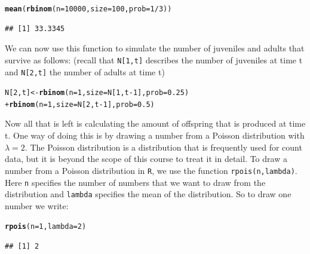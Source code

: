 \documentclass{article}\usepackage[]{graphicx}\usepackage[]{color}
\makeatletter
\newcommand{\hlnum}[1]{\textcolor[rgb]{0.686,0.059,0.569}{#1}}%
\newcommand{\hlopt}[1]{\textcolor[rgb]{0,0,0}{#1}}%
\newcommand{\hlstd}[1]{\textcolor[rgb]{0.345,0.345,0.345}{#1}}%
\newcommand{\hlkwb}[1]{\textcolor[rgb]{0.69,0.353,0.396}{#1}}%
\newcommand{\hlkwc}[1]{\textcolor[rgb]{0.333,0.667,0.333}{#1}}%
\newcommand{\hlkwd}[1]{\textcolor[rgb]{0.737,0.353,0.396}{\textbf{#1}}}%
\newenvironment{kframe}{%
 \def\at@end@of@kframe{}%
 \ifinner\ifhmode%
  \def\at@end@of@kframe{\end{minipage}}%
  \begin{minipage}{\columnwidth}%
 \fi\fi%
 \def\FrameCommand##1{\hskip\@totalleftmargin \hskip-\fboxsep
 \colorbox{shadecolor}{##1}\hskip-\fboxsep
     \hskip-\linewidth \hskip-\@totalleftmargin \hskip\columnwidth}%
 \MakeFramed {\advance\hsize-\width
   \@totalleftmargin\z@ \linewidth\hsize
   \@setminipage}}%
 {\par\unskip\endMakeFramed%
 \at@end@of@kframe}
\newenvironment{knitrout}{}{} %
\makeatother
\begin{document}
\begin{knitrout}
\color{fgcolor}\begin{kframe}
\begin{alltt}
\hlkwd{mean}\hlstd{(}\hlkwd{rbinom}\hlstd{(}\hlkwc{n}\hlstd{=}\hlnum{10000}\hlstd{,}\hlkwc{size}\hlstd{=}\hlnum{100}\hlstd{,}\hlkwc{prob}\hlstd{=}\hlnum{1}\hlopt{/}\hlnum{3}\hlstd{))}
\end{alltt}
\begin{verbatim}
## [1] 33.3345
\end{verbatim}
\end{kframe}
\end{knitrout}
We can now use this function to simulate the number of juveniles and adults that survive as follows:
(recall that \texttt{N[1,t]} describes the number of juveniles at time t and \texttt{N[2,t]} the number of adults at time t)
\begin{knitrout}
\color{fgcolor}\begin{kframe}
\begin{alltt}
\hlstd{N[}\hlnum{2}\hlstd{,t]}\hlkwb{<-}\hlkwd{rbinom}\hlstd{(}\hlkwc{n}\hlstd{=}\hlnum{1}\hlstd{,}\hlkwc{size}\hlstd{=N[}\hlnum{1}\hlstd{,t}\hlopt{-}\hlnum{1}\hlstd{],}\hlkwc{prob}\hlstd{=}\hlnum{0.25}\hlstd{)}
        \hlopt{+} \hlkwd{rbinom}\hlstd{(}\hlkwc{n}\hlstd{=}\hlnum{1}\hlstd{,}\hlkwc{size}\hlstd{=N[}\hlnum{2}\hlstd{,t}\hlopt{-}\hlnum{1}\hlstd{],}\hlkwc{prob}\hlstd{=}\hlnum{0.5}\hlstd{)}
\end{alltt}
\end{kframe}
\end{knitrout}
Now all that is left is calculating the amount of offspring that is produced at time t. One way of doing this is by drawing a number from a Poisson distribution with $\lambda=2$. The Poisson distribution is a distribution that is frequently used for count data, but it is beyond the scope of this course to treat it in detail. To draw a number from a Poisson distribution in \texttt{R}, we use the function \texttt{rpois(n,lambda)}. Here \texttt{n} specifies the number of numbers that we want to draw from the distribution and \texttt{lambda} specifies the mean of the distribution. So to draw one number we write:
\begin{knitrout}
\color{fgcolor}\begin{kframe}
\begin{alltt}
\hlkwd{rpois}\hlstd{(}\hlkwc{n}\hlstd{=}\hlnum{1}\hlstd{,}\hlkwc{lambda}\hlstd{=}\hlnum{2}\hlstd{)}
\end{alltt}
\begin{verbatim}
## [1] 2
\end{verbatim}
\end{kframe}
\end{knitrout}
\end{document}
